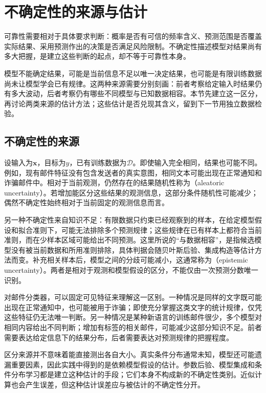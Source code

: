 \section{不确定性的来源与估计}
\label{sec:reliability-uncertainty}

可靠性需要相对于具体要求判断：概率是否有可信的频率含义、预测范围是否覆盖实际结果、采用预测作出的决策是否满足风险限制。不确定性描述模型对结果尚有多大把握，是建立这些判断的起点，却不等于可靠性本身。

模型不能确定结果，可能是当前信息不足以唯一决定结果，也可能是有限训练数据尚未让模型学会已有规律。这两种来源需要分别刻画：前者考察给定输入时结果仍有多大波动，后者考察仍有哪些不同模型与已知数据相容。本节先建立这一区分，再讨论两类来源的估计方法；这些估计是否兑现其含义，留到下一节用独立数据检验。

\subsection{不确定性的来源}
\label{sec:reliability-uncertainty-sources}

设输入为$\bm{x}$，目标为$y$，已有训练数据为$\mathcal D$。即使输入完全相同，结果也可能不同。例如，现有邮件特征没有包含发送者的真实意图，相同文本可能出现在正常通知和诈骗邮件中。相对于当前观测，仍然存在的结果随机性称为（aleatoric uncertainty）。若增加能区分这些结果的观测信息，这部分条件随机性可能减少；偶然不确定性始终相对于当前固定的观测信息而言。

另一种不确定性来自知识不足：有限数据只约束已经观察到的样本，在给定模型假设和拟合准则下，可能无法排除多个预测规律；这些规律在已有样本上都符合当前准则，而在少样本区域可能给出不同预测。这里所说的“与数据相容”，是指候选模型没有被当前数据和所用准则排除，具体判据会随贝叶斯后验、集成构造等估计方法而变。补充相关样本后，模型之间的分歧可能减小，这通常称为（epistemic uncertainty）。两者是相对于观测和模型假设的区分，不能仅由一次预测分数唯一识别。

对邮件分类器，可以固定可见特征来理解这一区别。一种情况是同样的文字既可能出现在正常通知中，也可能被用于诈骗；即使充分掌握这类文字的统计规律，仅凭这些特征仍无法唯一判断。另一种情况是某种新语言的训练邮件很少，多个模型对相同内容给出不同判断；增加有标签的相关邮件，可能减少这部分知识不足。前者需要表达给定信息下的结果分布，后者需要表达对预测规律的把握程度。

区分来源并不意味着能直接测出各自大小。真实条件分布通常未知，模型还可能遗漏重要因素，因此实践中得到的是依赖模型假设的估计。参数后验、模型集成和条件分布学习都是建立这种估计的手段；它们本身不构成新的不确定性类别。近似计算也会产生误差，但这种估计误差应与被估计的不确定性分开。

